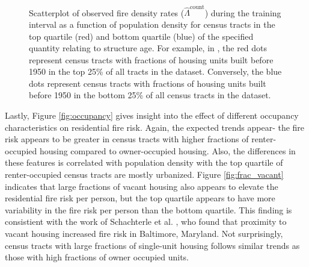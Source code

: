 \documentclass{svjour3}
\begin{document}
\begin{figure}[!ht]
\begin{center}
{          }
            \\
          
      \end{center}
      \caption{Scatterplot of observed fire density rates ($\hat\Lambda^{\text{count}}$) during the training interval as a function of population density for census tracts in the top quartile (red) and bottom quartile (blue) of the specified quantity relating to structure age. For example, in \protect{}, the red dots represent census tracts with fractions of housing units built before 1950 in the top 25\% of all tracts in the dataset. Conversely, the blue dots represent census tracts with fractions of housing units built before 1950 in the bottom 25\% of all census tracts in the dataset.}
     \label{fig:building age}
  \end{figure}
 
    Lastly, Figure \ref{fig:occupancy} gives insight into the effect of different occupancy characteristics on residential fire risk. Again, the expected trends appear- the fire risk appears to be greater in census tracts with higher fractions of renter-occupied housing compared to owner-occupied housing. Also, the differences in these features is correlated with population density with the top quartile of renter-occupied census tracts are mostly urbanized. Figure \ref{fig:frac_vacant} indicates that large fractions of vacant housing also appears to elevate the residential fire risk per person, but the top quartile appears to have more variability in the fire risk per person than the bottom quartile. This finding is consistient with the work of Schachterle et al. \cite{schachterle2012proximity}, who found that proximity to vacant housing increased fire risk in Baltimore, Maryland.  Not surprisingly, census tracts with large fractions of single-unit housing follows similar trends as those with high fractions of owner occupied units. 
 
\end{document}
